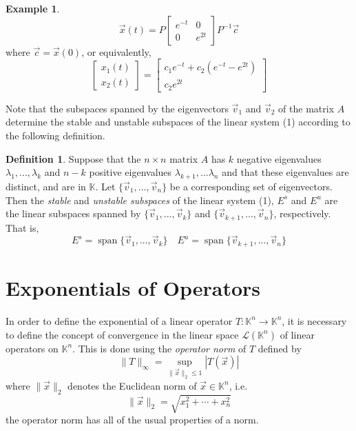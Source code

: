 \documentclass[11pt]{book}
\theoremstyle{definition}\newtheorem{definition}[subsection]{Definition}
\theoremstyle{definition}\newtheorem{example}[subsection]{Example}
\theoremstyle{definition}\newtheorem{notation}[subsection]{Notation}
\theoremstyle{definition}\newtheorem{remark}[subsection]{Remark}
\theoremstyle{theorem}\newtheorem{theorem}[subsection]{Theorem}
\theoremstyle{theorem}\newtheorem{lemma}[subsection]{Lemma}
\theoremstyle{theorem}\newtheorem{proposition}[subsection]{Proposition}
\theoremstyle{theorem}\newtheorem{corollary}[subsection]{Corollary}
\theoremstyle{theorem}\newtheorem{case}{Case}
\theoremstyle{remark}\newtheorem{subcase}{Subcase}[case]
\newcommand{\K}{\mathbb{K}}
\renewcommand{\L}{\mathscr{L}}
\DeclareMathOperator{\Span}{span}
\begin{document}
\begin{example}
    \begin{equation*}
        \vec{x}(t) = P\begin{bmatrix} e^{-t} & 0 \\ 0 & e^{2t} \end{bmatrix} P^{-1} \vec{c}
    \end{equation*}
    where $\vec{c} = \vec{x}(0)$, or equivalently,
    \begin{equation*}
        \begin{bmatrix} x_1(t) \\ x_2(t) \end{bmatrix} = \begin{bmatrix} c_1e^{-t} + c_2(e^{-t} - e^{2t}) \\ c_2e^{2t} \end{bmatrix} \tag{3}
    \end{equation*}
\end{example}

Note that the subspaces spanned by the eigenvectors $\vec{v}_1$ and $\vec{v}_2$ of the matrix $A$ determine the stable and unstable subspaces of the linear system (1) according to the following definition.

\begin{definition}\label{definition:1.3.4}
    Suppose that the $n \times n$ matrix $A$ has $k$ negative eigenvalues $\lambda_1,..., \lambda_k$ and $n - k$ positive eigenvalues $\lambda_{k + 1},... \lambda_n$ and that these eigenvalues are distinct, and are in $\K$. Let $\{\vec{v}_1,..., \vec{v}_n\}$ be a corresponding set of eigenvectors. Then the \emph{stable} and \emph{unstable subspaces} of the linear system (1), $E^s$ and $E^u$ are the linear subspaces spanned by $\{\vec{v}_1,..., \vec{v}_k\}$ and $\{\vec{v}_{k + 1},..., \vec{v}_n\}$, respectively. That is,
    \begin{equation*}
        E^s = \Span\{\vec{v}_1,..., \vec{v}_k\} \quad E^u = \Span\{\vec{v}_{k + 1},..., \vec{v}_n\}
    \end{equation*}  
\end{definition}

\section{Exponentials of Operators}

In order to define the exponential of a linear operator $T : \K^n \to \K^n$, it is necessary to define the concept of convergence in the linear space $\L(\K^n)$ of linear operators on $\K^n$. This is done using the \emph{operator norm} of $T$ defined by    
\begin{equation*}
    \|T\|_{\infty} = \sup_{\|\vec{x}\|_2 \leq 1} |T(\vec{x})|
\end{equation*}
where $\|\vec{x}\|_2$ denotes the Euclidean norm of $\vec{x} \in \K^n$, i.e. 
\begin{equation*}
    \|\vec{x}\|_2 = \sqrt{x_1^2 + \cdots + x_n^2}
\end{equation*}
the operator norm has all of the usual properties of a norm.
\end{document}
